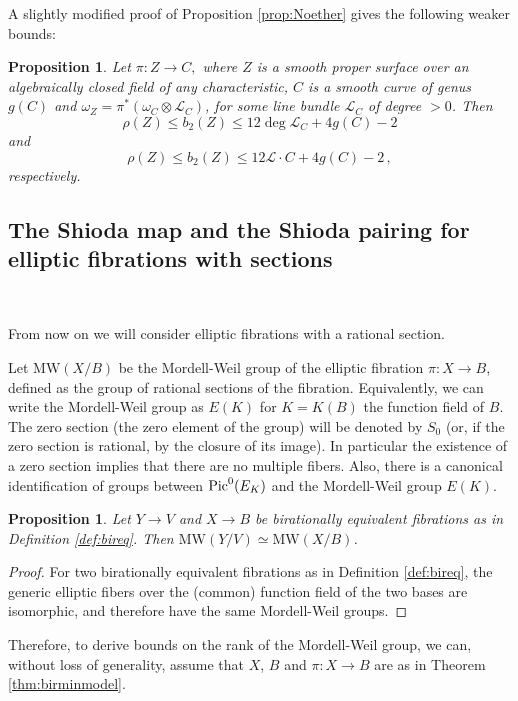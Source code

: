 \documentclass[11pt]{amsart}
\newtheorem{proposition}[theorem]{Proposition}
\theoremstyle{definition}
\theoremstyle{definition}
\theoremstyle{remark}
\theoremstyle{remark}
\theoremstyle{definition}
\theoremstyle{conjecture}
\newcommand{\MW}{\mathrm{MW}}
\begin{document}
A slightly modified proof of Proposition \ref{prop:Noether} gives the following weaker bounds:
\begin{proposition}\label{prop:NoetherAnyC} Let
$
\pi \colon Z \to C,
$
where  $Z$ is a smooth  proper surface
over an algebraically closed field of any characteristic,
$C$ is a smooth curve of genus $g(C)$ and $\omega_Z= \pi^*(\omega_C
\otimes  \mathcal{L}_C)$, for some line bundle $\mathcal{L}_C$
of degree $>0$.
Then
  \begin{equation*}\label{rhoform2}
\rho (Z) \le b_2 (Z)\le 12 \deg {\mathcal L}_C + 4 g(C)  -2
\end{equation*}
and 
 \begin{equation*}
\rho (Z) \le b_2 (Z) \le 12  \mathcal{L} \cdot C+4g(C)-2 \,,
\end{equation*}   
respectively.
\end{proposition}

\vskip 0.4in






\subsection{The Shioda map and the Shioda pairing  for elliptic fibrations with sections}~

\medskip
 From now on   we will consider elliptic fibrations with a rational section.

Let $\MW(X/B)$ be the  Mordell-Weil group of the elliptic fibration $\pi: X\to B$,  defined as  the 
 group of rational sections of
the fibration.
  Equivalently, we can write the Mordell-Weil group as $E(K)$ for $K=K(B)$ the function field of $B$.  The zero section (the zero element of the group) will be denoted by $S_0$ (or, if the zero section is rational, by the closure of its image). In particular the existence of a zero section implies that there are no multiple fibers.
   Also, there is a canonical
identification of groups between ${\rm Pic}^0(E_K)$ and the Mordell-Weil
group $E(K)$.
 

\begin{proposition} Let $Y \to V$ and $ X \to B$ be birationally equivalent fibrations as in Definition \ref{def:bireq}. Then $\MW(Y/V) \simeq \MW(X/B) $.

    
\end{proposition}
\begin{proof}For two birationally equivalent fibrations as in Definition \ref{def:bireq}, the
generic elliptic fibers over the (common)
function field of the two bases are isomorphic, and therefore have the same
Mordell-Weil groups. \end{proof}
 Therefore, to derive bounds on the rank of the Mordell-Weil group, we can, without loss of generality, assume that 
$X$, $B$ and  $\pi: X\to B$ are as in Theorem \ref{thm:birminmodel}. 
\end{document}
